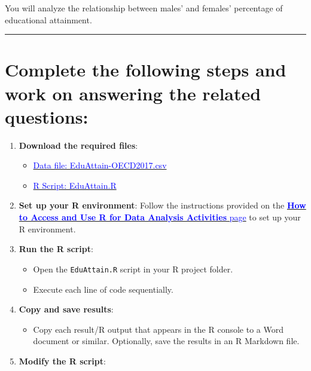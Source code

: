 \documentclass[oneside,openany]{book}
\providecommand{\tightlist}{%
  \setlength{\itemsep}{0pt}\setlength{\parskip}{0pt}}
\begin{document}
You will analyze the relationship between males' and females' percentage of educational attainment.

\begin{center}\rule{0.5\linewidth}{0.5pt}\end{center}

\section{Complete the following steps and work on answering the related questions:}\label{complete-the-following-steps-and-work-on-answering-the-related-questions-1}

\begin{enumerate}
\def\labelenumi{\arabic{enumi}.}
\item
  \textbf{Download the required files}:

  \begin{itemize}
  \tightlist
  \item
    \href{https://raw.githubusercontent.com/aslemand/Data-Analysis-Activities/refs/heads/main/data/Activity_10/EduAttain-OECD2017.csv}{\textcolor{blue}{Data file: EduAttain-OECD2017.csv}}
  \item
    \href{https://raw.githubusercontent.com/aslemand/Data-Analysis-Activities/refs/heads/main/data/Activity_10/EduAttain.R}{\textcolor{blue}{R Script: EduAttain.R}}
  \end{itemize}
\item
  \textbf{Set up your R environment}:
  Follow the instructions provided on the \hyperref[how-to-set-up-r-for-data-analysis-activities]{\textcolor{blue}{\textbf{How to Access and Use R for Data Analysis Activities} page}} to set up your R environment.
\item
  \textbf{Run the R script}:

  \begin{itemize}
  \tightlist
  \item
    Open the \texttt{EduAttain.R} script in your R project folder.
  \item
    Execute each line of code sequentially.
  \end{itemize}
\item
  \textbf{Copy and save results}:

  \begin{itemize}
  \tightlist
  \item
    Copy each result/R output that appears in the R console to a Word document or similar. Optionally, save the results in an R Markdown file.
  \end{itemize}
\item
  \textbf{Modify the R script}:


\end{enumerate}
\end{document}
